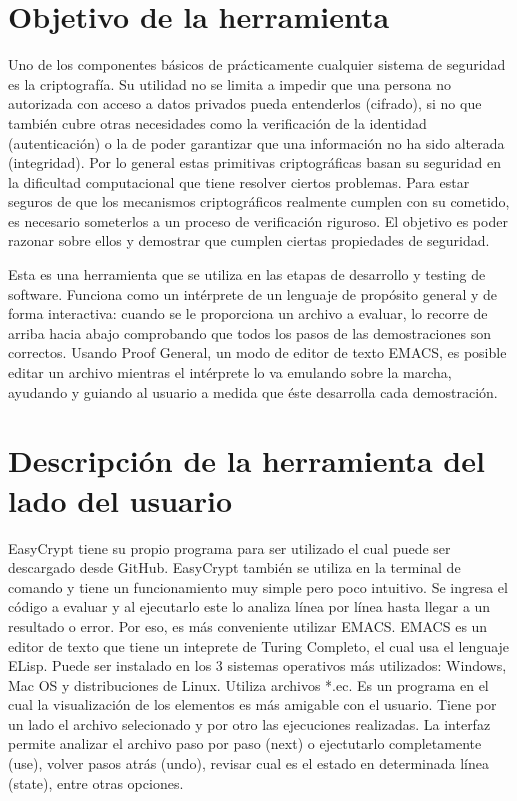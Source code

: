\documentclass[runningheads,a4paper]{llncs}
\begin{document}
\section{Objetivo de la herramienta} 
Uno de los componentes básicos de prácticamente cualquier sistema de seguridad es la criptografía. Su utilidad no se limita a impedir que una persona no autorizada con acceso a datos privados pueda entenderlos (cifrado), si no que también cubre otras necesidades como la verificación de la identidad (autenticación) o la de poder garantizar que una información no ha sido alterada (integridad). Por lo general estas primitivas criptográficas basan su seguridad en la dificultad computacional que tiene resolver ciertos problemas. Para estar seguros de que los mecanismos criptográficos realmente cumplen con su cometido, es necesario someterlos a un proceso de verificación riguroso. El objetivo es poder razonar sobre ellos y demostrar que cumplen ciertas propiedades de seguridad. 

Esta es una herramienta que se utiliza en las etapas de desarrollo y testing de software. Funciona como un intérprete de un lenguaje de propósito general y de forma interactiva: cuando se le proporciona un archivo a evaluar, lo recorre de arriba hacia abajo comprobando que todos los pasos de las demostraciones son correctos. Usando Proof General, un modo de editor de texto EMACS, es posible editar un archivo mientras el intérprete lo va emulando sobre la marcha, ayudando y guiando al usuario a medida que éste desarrolla cada demostración. 

\section{Descripción de la herramienta del lado del usuario}

EasyCrypt tiene su propio programa para ser utilizado el cual puede ser descargado desde GitHub.\cite{link1}
EasyCrypt también se utiliza en la terminal de comando y tiene un funcionamiento muy simple pero poco intuitivo. Se ingresa el código a evaluar y al ejecutarlo este lo analiza línea por línea hasta llegar a un resultado o error. Por eso, es más conveniente utilizar EMACS\cite{link2}. EMACS es un editor de texto que tiene un inteprete de Turing Completo, el cual usa el lenguaje ELisp. Puede ser instalado en los 3 sistemas operativos más utilizados: Windows, Mac OS y distribuciones de Linux. Utiliza archivos *.ec. Es un programa en el cual la visualización de los elementos es más amigable con el usuario. Tiene por un lado el archivo selecionado y por otro las ejecuciones realizadas. La interfaz permite analizar el archivo paso por paso (next) o ejectutarlo completamente (use), volver pasos atrás (undo), revisar cual es el estado en determinada línea (state), entre otras opciones.
\end{document}
